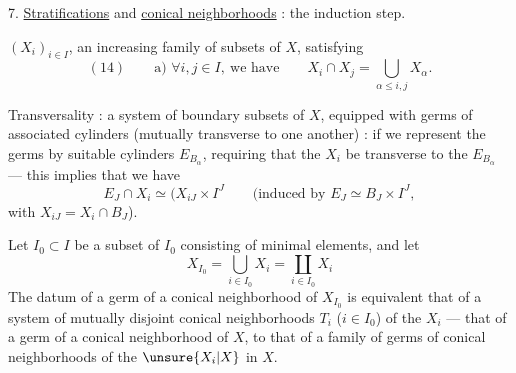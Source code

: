 7. \uline{Stratifications} and \uline{conical neighborhoods} : the induction
step.

$(X_i)_{i\in I}$, an increasing family of subsets of $X$,
satisfying
\[
(14)\qquad\text{a) }\forall i,j\in I,\ \text{we have}\qquad
X_i\cap X_j=\bigcup_{\alpha\le i,j}X_\alpha.
\]


Transversality : a system of boundary subsets  of
$X$, equipped with germs of associated cylinders
(mutually transverse to one another) : if we
represent the germs by suitable cylinders
$E_{B_\alpha}$, requiring that the $X_i$ be transverse
to the $E_{B_\alpha}$ --- this implies that we have
\[
E_J\cap X_i\simeq (X_{iJ}\times I^J
\qquad
\text{(induced by }E_J\simeq B_J\times I^J,
\]
with $X_{iJ}=X_i\cap B_J$).

Let $I_0\subset I$ be a subset of $I_0$ consisting
of minimal elements,  and let
\[
X_{I_0}=\bigcup_{i\in I_0}X_i=\coprod_{i\in I_0}X_i
\]
The datum of a germ 
of a  conical neighborhood of $X_{I_0}$ is equivalent 
that of a system of mutually disjoint conical neighborhoods
$T_i$ ($i\in I_0$) of the $X_i$ ---
that of a germ of a conical neighborhood of $X$,
to that of a family of germs of conical
neighborhoods of the $\unsure{X_i|X}$ in $X$.
